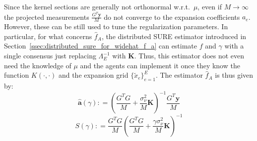 \documentclass[10pt,twocolumn,twoside]{IEEEtran}					%
\theoremstyle	{plain}
\newcommand{\DefinedAs}			[0]	{\mathrel{\mathop:}=}
\newcommand	{\Section}				[0]	{Section}
\begin{document}
Since the kernel sections are generally not orthonormal w.r.t.\ $\mu$, even if $M \rightarrow \infty$ the projected measurements $\frac{G^{T} \bm{y}}{M}$ do not converge to the expansion coefficients $a_{e}$. However, these can be still used to tune the regularization parameters. In particular, for what concerns $\widehat{f}_{A}$, the distributed \ac{SURE} estimator introduced in \Section~\ref{ssec:distributed_sure_for_widehat_f_a} can estimate $f$ and $\gamma$ with a single consensus just replacing $\Lambda^{-1}_{E}$ with $\bm{K}$. Thus, this estimator does not even need the knowledge of $\mu$ and the agents can implement it once they know the function $K\left( \cdot, \cdot \right)$ and the expansion grid $\{\widetilde{x}_{e}\}_{e=1}^E$. The estimator $\widehat{f}_{A}$ is thus given by:
$$ \widehat{\bm{a}}(\gamma)
	\DefinedAs
	\left( \frac{G^{T} G}{M} + \frac{\sigma^{2}_{\nu}}{M} \bm{K} \right)^{-1} \frac{G^{T} \bm{y}}{M} 
 $$
$$S(\gamma)
	\DefinedAs
	\frac{G^{T} G}{M} \left( \frac{G^{T} G}{M} + \frac{\gamma \sigma^{2}_{\nu}}{ M} \bm{K} \right)^{-1} $$
\end{document}
